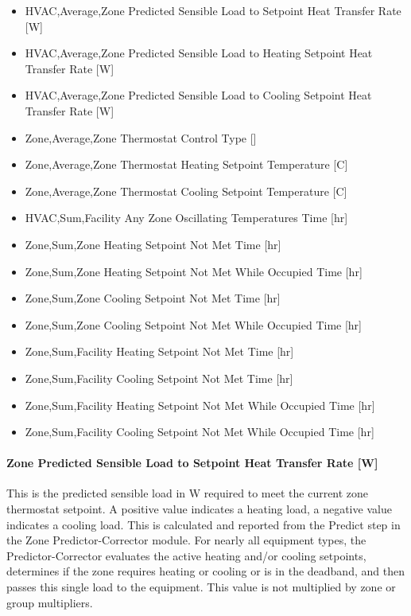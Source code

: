 \begin{itemize}
\item
  HVAC,Average,Zone Predicted Sensible Load to Setpoint Heat Transfer Rate {[}W{]}
\item
  HVAC,Average,Zone Predicted Sensible Load to Heating Setpoint Heat Transfer Rate {[}W{]}
\item
  HVAC,Average,Zone Predicted Sensible Load to Cooling Setpoint Heat Transfer Rate {[}W{]}
\item
  Zone,Average,Zone Thermostat Control Type {[]}
\item
  Zone,Average,Zone Thermostat Heating Setpoint Temperature {[}C{]}
\item
  Zone,Average,Zone Thermostat Cooling Setpoint Temperature {[}C{]}
\item
  HVAC,Sum,Facility Any Zone Oscillating Temperatures Time {[}hr{]}
\item
  Zone,Sum,Zone Heating Setpoint Not Met Time {[}hr{]}
\item
  Zone,Sum,Zone Heating Setpoint Not Met While Occupied Time {[}hr{]}
\item
  Zone,Sum,Zone Cooling Setpoint Not Met Time {[}hr{]}
\item
  Zone,Sum,Zone Cooling Setpoint Not Met While Occupied Time {[}hr{]}
\item
  Zone,Sum,Facility Heating Setpoint Not Met Time {[}hr{]}
\item
  Zone,Sum,Facility Cooling Setpoint Not Met Time {[}hr{]}
\item
  Zone,Sum,Facility Heating Setpoint Not Met While Occupied Time {[}hr{]}
\item
  Zone,Sum,Facility Cooling Setpoint Not Met While Occupied Time {[}hr{]}
\end{itemize}

\paragraph{Zone Predicted Sensible Load to Setpoint Heat Transfer Rate {[}W{]}}\label{zone-predicted-sensible-load-to-setpoint-heat-transfer-rate-w}

This is the predicted sensible load in W required to meet the current zone thermostat setpoint. A positive value indicates a heating load, a negative value indicates a cooling load. This is calculated and reported from the Predict step in the Zone Predictor-Corrector module. For nearly all equipment types, the Predictor-Corrector evaluates the active heating and/or cooling setpoints, determines if the zone requires heating or cooling or is in the deadband, and then passes this single load to the equipment. This value is not multiplied by zone or group multipliers.

